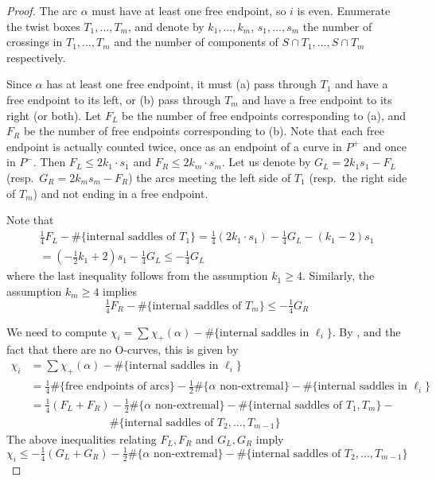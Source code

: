 \documentclass[12pt,reqno]{amsart}
\theoremstyle{plain}
\theoremstyle{definition}
\begin{document}
\begin{proof}
The arc $\alpha$ must have at least one free endpoint, so $i$ is even. 
Enumerate the twist boxes $T_1,\dots,T_m$, and denote by $k_1,\dots,k_m$, $s_1,\dots,s_m$ 
the number of crossings in $T_1,\dots,T_m$ and the number of components of 
$S\cap T_1,\dots,S\cap T_m$ respectively.

Since $\alpha$ has at least one free endpoint, it must (a) pass through $T_1$ and have a 
free endpoint to its left, or (b) pass through $T_m$ and have a free endpoint to its 
right (or both). Let $F_L$ be the number of free endpoints corresponding to (a), and 
$F_R$ be the number of free endpoints corresponding to (b). Note that each free endpoint 
is actually counted twice, once as an endpoint of a curve in $P^+$ and once in $P^-$. 
Then $F_L \le 2k_1 \cdot s_1$ and $F_R \le 2k_m\cdot s_m$. Let us denote by 
$G_L = 2k_1s_1 - F_L$ (resp.\ $G_R = 2k_m s_m - F_R$) the arcs meeting the left 
side of $T_1$ (resp.\ the right side of $T_m$) and not ending in a free endpoint. 
    
Note that 
\begin{multline}
\tfrac14 F_L  - \#\{\text{internal saddles of }T_1\} = \tfrac14 (2k_1 \cdot s_1) - 
\tfrac14 G_L  - (k_1-2)s_1 
\\
= (-\tfrac12 k_1 +2)s_1 - \tfrac14 G_L \le - \tfrac14 G_L     
\end{multline}
where the last inequality follows from the assumption $k_1\ge 4$.
Similarly, the assumption $k_m\ge 4$ implies
\[
\tfrac14 F_R  - \#\{\text{internal saddles of }T_m\} \le - \tfrac14 G_R
\]

We need to compute $\chi_i = \sum \chi_+(\alpha) - \#\{\text{internal saddles in }\ell_i\}$. 
By ,  and the fact that 
there are no O-curves, this is given by
\begin{align*}
\chi_i &= \sum \chi_+(\alpha) - \#\{\text{internal saddles in }\ell_i\} \\
&= \tfrac14 \#\{\text{free endpoints of arcs}\} - \tfrac12 \#\{\alpha\text{ non-extremal}\} - \#
\{\text{internal saddles in }\ell_i\} \\
&= \tfrac14 (F_L + F_R) -\tfrac12\#\{\alpha\text{ non-extremal}\} - \#\{\text{internal 
saddles of }T_1,T_m\} - \\
& \hspace{3cm}  \#\{\text{internal saddles of }T_2,\dots, T_{m-1}\}
\end{align*}
The above inequalities relating $F_L, F_R$ and $G_L, G_R$ imply
\begin{equation}\label{Eqn:ChiBound}
\chi_i \leq -\tfrac14 (G_L + G_R) - \tfrac12\#\{\alpha\text{ non-extremal}\} 
- \#\{\text{internal saddles of }T_2,\dots, T_{m-1}\}
\end{equation}


\end{proof}
\end{document}
